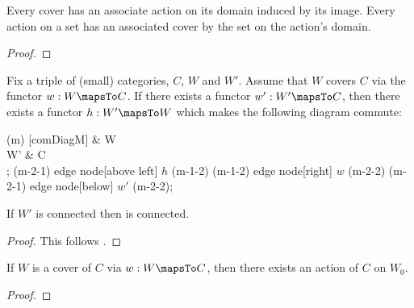 \begin{lemma}
Every cover has an associate action on its domain induced by its image.  Every action on a 
set has an associated cover by the set on the action's domain.
\end{lemma}
\begin{proof}
\end{proof}


\begin{lemma}
Fix a triple of (small) categories, $C$, $W$ and $W'$.  Assume that $W$ covers $C$ via the 
functor $w : W \mapsTo C$.  If there exists a functor $w' : W' \mapsTo C$, then there exists 
a functor $h : W' \mapsTo W$ which makes the following diagram commute:
\begin{cTikzPicture}
\matrix (m) [comDiagM]
{      & W \\
   W' & C \\ };
(m-2-1) edge node[above left] {$h$} (m-1-2)
(m-1-2) edge node[right] {$w$} (m-2-2)
(m-2-1) edge node[below]  {$w'$} (m-2-2);
\end{cTikzPicture}
If $W'$ is connected then  is connected.
\end{lemma}
\begin{proof}
This follows \cite[Lemma 10.3.1]{brown2006TopologyGroupoids}.   
\end{proof}


\begin{lemma}
If $W$ is a cover of $C$ via $w : W \mapsTo C$, then there exists an action of $C$ on $W_0$.
\end{lemma}
\begin{proof}
\end{proof}

